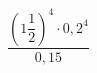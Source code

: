 \begin{ex}[type=calculate]
	\begin{condition}
		\( \dfrac{\left( 1\dfrac{1}{2} \right)^4\cdot0,2^4}{0,15} \)
	\end{condition}
\end{ex}